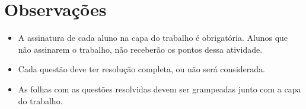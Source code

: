 \documentclass[a4paper]{article}
\begin{document}
\section{Observações}

\begin{itemize}
\item A assinatura de cada aluno na capa do trabalho é
  obrigatória. Alunos que não assinarem o trabalho, não receberão os
  pontos dessa atividade.
\item Cada questão deve ter resolução completa, ou não será
  considerada.
\item As folhas com as questões resolvidas devem ser grampeadas junto
  com a capa do trabalho.
\end{itemize}
\end{document}
